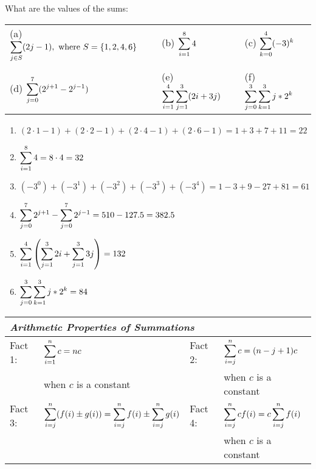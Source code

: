 \begin{questions}
 What are the values of the sums:\\
\begin{tabular}{lll}
    (a) $\displaystyle \sum_{j\in S} (2j - 1), \text{ where } S = \{1, 2, 4, 6\}$
    & (b) $\displaystyle \sum_{i=1}^{8} 4$  \hspace*{1in} 
    & (c) $\displaystyle \sum_{k=0}^{4} (-3)^k$ \\
    & & \\
    (d) $\displaystyle \sum_{j=0}^{7} (2^{j+1} - 2^{j-1})$
    & (e) $\displaystyle \sum_{i=1}^{4} \sum_{j=1}^{3} (2i + 3j)$
    & (f) $\displaystyle \sum_{j=0}^{3} \sum_{k=1}^{3} j*2^{k}$
\end{tabular}
    \ifprintanswers
        \vspace{-10pt}
   \fi
\begin{solution}
    \begin{enumerate}[label=(\alph*),itemsep=2pt,parsep=0pt,
    topsep=0pt,partopsep=0pt]
        \item $(2\cdot1 - 1)+(2\cdot2 - 1)+(2\cdot4 -1)+(2\cdot6-1) = 1+3+7+11 = 22$ 
        \item $\displaystyle \sum_{i=1}^8 4 = 8\cdot4 = 32$
        \item $(-3^0) + (-3^1) + (-3^2) + (-3^3) + (-3^4) = 1 -3 + 9 -27 + 81 = 61 $
        \item $\displaystyle \sum_{j=0}^7 2^{j+1} - \sum_{j=0}^7 2^{j-1} = 510 - 127.5 = 382.5$
        \item $\displaystyle \sum_{i=1}^4 \left( \sum_{j=1}^3 2i + \sum_{j=1}^3 3j \right) = 132$
        \item $\displaystyle \sum_{j=0}^3 \sum_{k=1}^3 j*2^k = 84$
    \end{enumerate}
\end{solution}



\small
\begin{tabular}{llll}
  \multicolumn{3}{l}{\textit{Arithmetic Properties of Summations}} &  \\
  \hline   
  Fact 1: & $\displaystyle \sum_{i=1}^n c  = nc$     & Fact 2: & $\displaystyle \sum_{i=j}^n c  = (n-j+1)c$ \\
    & when $c$ is a constant & & when $c$ is a constant \\ 
  Fact 3: & $\displaystyle \sum_{i=j}^n (f(i) \pm g(i)) = \sum_{i=j}^n f(i) \pm \sum_{i=j}^n g(i)$ \hspace{0.4in} & Fact 4: & $\displaystyle \sum_{i=j}^n cf(i) = c \sum_{i=j}^n f(i)$ \\
    & & & when $c$ is a constant \\
  \hline 
\end{tabular}


\end{questions}
